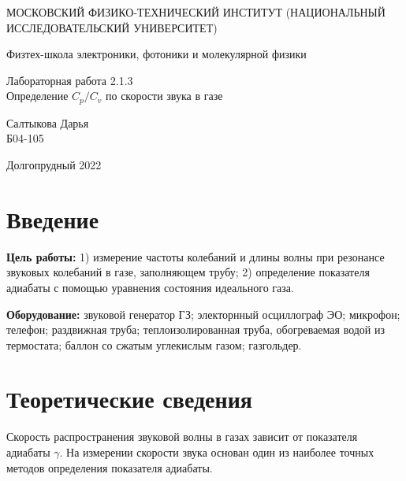 \documentclass[a4paper,12pt]{article} %
\begin{document}
	
	\begin{titlepage}
	\begin{center}
		{\large МОСКОВСКИЙ ФИЗИКО-ТЕХНИЧЕСКИЙ ИНСТИТУТ (НАЦИОНАЛЬНЫЙ ИССЛЕДОВАТЕЛЬСКИЙ УНИВЕРСИТЕТ)}
	\end{center}
	\begin{center}
		{\large Физтех-школа электроники, фотоники и молекулярной физики}
	\end{center}
	
	
	\vspace{4.5cm}
	{\huge
		\begin{center}
			{Лабораторная работа 2.1.3}\\
			Определение $C_p/C_v$ по скорости звука в газе
		\end{center}
	}
	\vspace{2cm}
	\begin{flushright}
		{\LARGE Салтыкова Дарья \\
			\vspace{0.5cm}
			Б04-105}
	\end{flushright}
	\vspace{8cm}
	\begin{center}
		Долгопрудный 2022
	\end{center}
\end{titlepage}

\section{Введение}

\noindent
\textbf{Цель работы:} 1) измерение частоты колебаний и длины волны при резонансе звуковых колебаний в газе, заполняющем трубу; 2) определение показателя адиабаты с помощью уравнения состояния идеального газа.
\medskip

\noindent \textbf{Оборудование:} звуковой генератор ГЗ; электорнный осциллограф ЭО; микрофон; телефон; раздвижная труба; теплоизолированная труба, обогреваемая водой из термостата; баллон со сжатым углекислым газом; газгольдер.

\medskip

\section{Теоретические сведения}

\noindent Скорость распространения звуковой волны в газах зависит от показателя адиабаты $ \gamma $. На измерении скорости звука основан один из наиболее точных методов определения показателя адиабаты.
\end{document}
